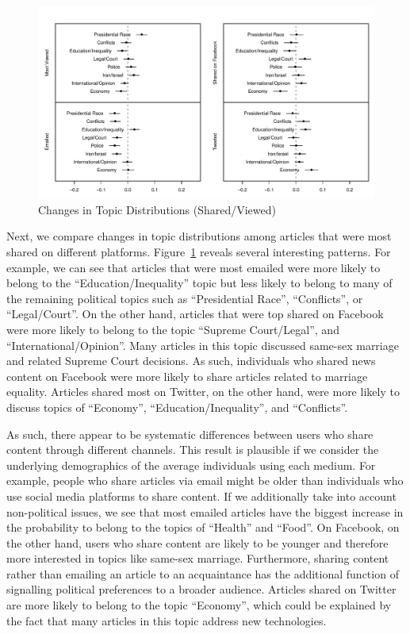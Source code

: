 \documentclass[12pt]{article}
\begin{document}
\begin{doublespace}
\begin{figure}
\caption{Changes in Topic Distributions (Shared/Viewed)}\label{fig:res_share_polecon}
\includegraphics[width=\textwidth]{../calc/fig/res_share_polecon} 
\end{figure}

Next, we compare changes in topic distributions among articles that were most shared on different platforms. Figure~\ref{fig:res_share_polecon} reveals several interesting patterns. For example, we can see that articles that were most emailed were more likely to belong to the ``Education/Inequality'' topic but less likely to belong to many of the remaining political topics such as ``Presidential Race'', ``Conflicts'', or ``Legal/Court''. On the other hand, articles that were top shared on Facebook were more likely to belong to the topic ``Supreme Court/Legal'', and ``International/Opinion''. Many articles in this topic discussed same-sex marriage and related Supreme Court decisions. As such, individuals who shared news content on Facebook were more likely to share articles related to marriage equality. Articles shared most on Twitter, on the other hand, were more likely to discuss topics of ``Economy'', ``Education/Inequality'', and ``Conflicts''.

As such, there appear to be systematic differences between users who share content through different channels. This result is plausible if we consider the underlying demographics of the average individuals using each medium. For example, people who share articles via email might be older than individuals who use social media platforms to share content. If we additionally take into account non-political issues, we see that most emailed articles have the biggest increase in the probability to belong to the topics of ``Health'' and ``Food''. On Facebook, on the other hand, users who share content are likely to be younger and therefore more interested in topics like same-sex marriage. Furthermore, sharing content rather than emailing an article to an acquaintance has the additional function of signalling political preferences to a broader audience. Articles shared on Twitter are more likely to belong to the topic ``Economy'', which could be explained by the fact that many articles in this topic address new technologies.


\end{doublespace}
\end{document}
